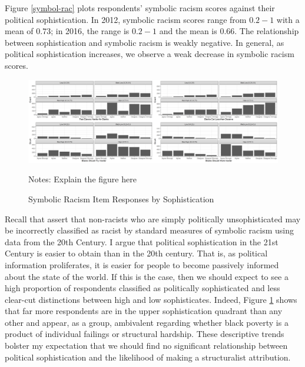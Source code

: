 \documentclass[12pt]{paper}
\begin{document}
Figure \ref{symbol-rac} plots respondents' symbolic racism scores against their political sophistication.  In 2012, symbolic racism scores range from $0.2-1$ with a mean of $0.73$; in 2016, the range is $0.2-1$ and the mean is $0.66$. The relationship between sophistication and symbolic racism is weakly negative. In general, as political sophistication increases, we observe a weak decrease in symbolic racism scores.

\begin{figure}[H]
	\centering
	\includegraphics[scale=.4]{fig/response-by-soph.png}
	{\singlespacing
		\parbox{0.78\textwidth}{\scriptsize%
			Notes: Explain the figure here
	}}
	\caption{Symbolic Racism Item Responses by Sophistication}
	\label{response-soph}
\end{figure}

Recall that \cite{gomez_rethinking_2006} assert that non-racists who are simply politically unsophisticated may be incorrectly classified as racist by standard measures of symbolic racism using data from the 20th Century. I argue that political sophistication in the 21st Century is easier to obtain than in the 20th century. That is, as political information proliferates, it is easier for people to become passively informed about the state of the world. If this is the case, then we should expect to see a high proportion of respondents classified as politically sophisticated and less clear-cut distinctions between high and low sophisticates. Indeed, Figure \ref{response-soph} shows that far more respondents are in the upper sophistication quadrant than any other and appear, as a group, ambivalent regarding whether black poverty is a product of individual failings or structural hardship. These descriptive trends bolster my expectation that we should find no significant relationship between political sophistication and the likelihood of making a structuralist attribution.
\end{document}
